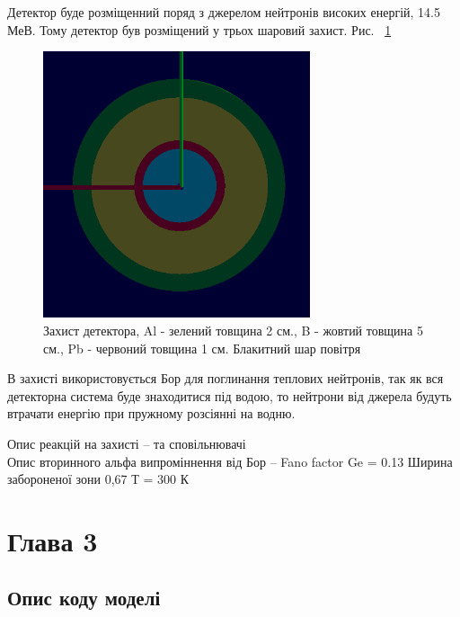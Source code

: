 \documentclass[a4paper, 14pt]{article}
\numberwithin{equation}{section}
\numberwithin{table}{section}
\begin{document}
	Детектор буде розміщенний поряд з джерелом нейтронів високих енергій, 14.5 МеВ. Тому детектор був розміщений у трьох шаровий захист. Рис. ~\ref{ris:s_detector_P}
	
	\begin{figure}[hbt!]
		\centering \includegraphics[width=0.7\textwidth]{images/dectorPrt.png}
		\caption{Захист детектора, Al - зелений товщина 2 см., B - жовтий товщина 5 см., Pb - червоний товщина 1 см. Блакитний шар повітря} 
		\label{ris:s_detector_P}	
	\end{figure} 

	В захисті використовується Бор для поглинання теплових нейтронів, так як вся детекторна система буде знаходитися під водою, то нейтрони від джерела будуть втрачати енергію при пружному розсіянні на водню. 
	
	Опис реакцій на захисті -- та сповільнювачі \\
	Опис вторинного альфа випроміннення від Бор --
	Fano factor Ge = 0.13 
	Ширина забороненої зони 0,67 Т = 300 К
	
	
\newpage
\section{Глава 3}
\setcounter{figure}{0}

\subsection{Опис коду моделі}
\end{document}
